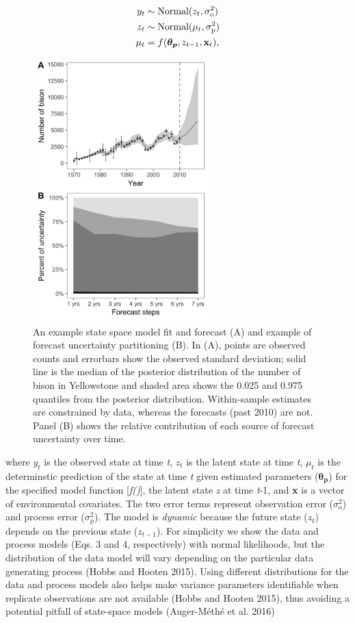 \documentclass[12pt,]{article}
\begin{document}
\begin{align}
y_t &\sim \text{Normal}(z_t, \sigma^2_{\text{o}}) \\
z_t &\sim \text{Normal}(\mu_t, \sigma^2_{\text{p}}) \\
\mu_t &= f(\boldsymbol{\theta_p},z_{t-1},\bold{x}_t),
\end{align}

\begin{figure}
  \centering
     \includegraphics[height=4in]{../figures/bison_combined.png}
  \caption{An example state space model fit and forecast (A) and example of forecast uncertainty partitioning (B). In (A), points are observed counts and errorbars show the observed standard deviation; solid line is the median of the posterior distribution of the number of bison in Yellowstone and shaded area shows the 0.025 and 0.975 quantiles from the posterior distribution. Within-sample estimates are constrained by data, whereas the forecasts (past 2010) are not. Panel (B) shows the relative contribution of each source of forecast uncertainty over time.}
\end{figure}

where \(y_t\) is the observed state at time \emph{t}, \(z_t\) is the
latent state at time \emph{t}, \(\mu_t\) is the determinstic prediction
of the state at time \emph{t} given estimated parameters
(\(\boldsymbol{\theta_p}\)) for the specified model function
{[}\emph{f()}{]}, the latent state \emph{z} at time \emph{t}-1, and
\textbf{x} is a vector of environmental covariates. The two error terms
represent observation error (\(\sigma^2_{\text{o}}\)) and process error
(\(\sigma^2_{\text{p}}\)). The model is \emph{dynamic} because the
future state (\(z_t\)) depends on the previous state (\(z_{t-1}\)). For
simplicity we show the data and process models (Eqs. 3 and 4,
respectively) with normal likelihoods, but the distribution of the data
model will vary depending on the particular data generating process
(Hobbs and Hooten 2015). Using different distributions for the data and
process models also helps make variance parameters identifiable when
replicate observations are not available (Hobbs and Hooten 2015), thus
avoiding a potential pitfall of state-space models (Auger-Méthé et al.
2016)
\end{document}
